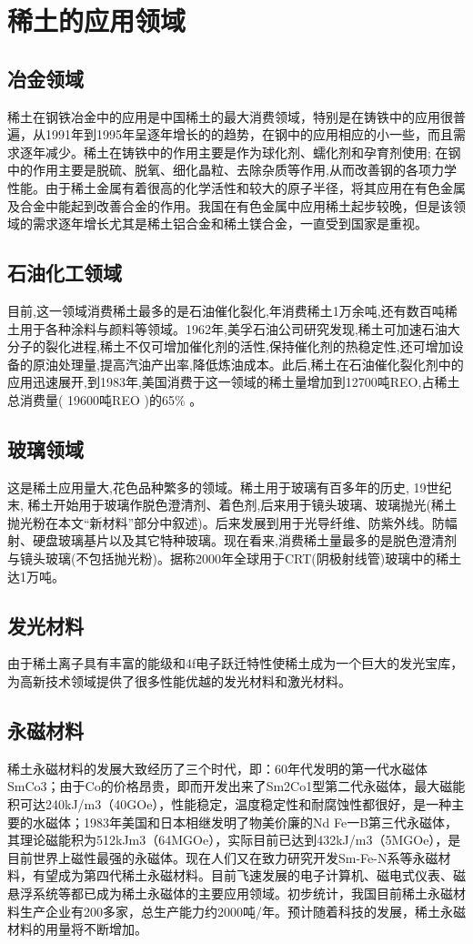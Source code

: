 \documentclass[twoside,twocolumn]{article}
\begin{document}

\section{稀土的应用领域}

\subsection{冶金领域}
稀土在钢铁冶金中的应用是中国稀土的最大消费领域，特别是在铸铁中的应用很普遍，从1991年到1995年呈逐年增长的的趋势，在钢中的应用相应的小一些，而且需求逐年减少。稀土在铸铁中的作用主要是作为球化剂、蠕化剂和孕育剂使用; 在钢中的作用主要是脱硫、脱氧、细化晶粒、去除杂质等作用,从而改善钢的各项力学性能。由于稀土金属有着很高的化学活性和较大的原子半径，将其应用在有色金属及合金中能起到改善合金的作用。我国在有色金属中应用稀土起步较晚，但是该领域的需求逐年增长尤其是稀土铝合金和稀土镁合金，一直受到国家是重视。
\subsection{石油化工领域}
目前,这一领域消费稀土最多的是石油催化裂化,年消费稀土1万余吨,还有数百吨稀土用于各种涂料与颜料等领域。1962年,美孚石油公司研究发现,稀土可加速石油大分子的裂化进程,稀土不仅可增加催化剂的活性,保持催化剂的热稳定性,还可增加设备的原油处理量,提高汽油产出率,降低炼油成本。此后,稀土在石油催化裂化剂中的应用迅速展开,到1983年,美国消费于这一领域的稀土量增加到12700吨REO,占稀土总消费量( 19600吨REO )的65$\%$ 。
\subsection{玻璃领域}
这是稀土应用量大,花色品种繁多的领域。稀土用于玻璃有百多年的历史, 19世纪末, 稀土开始用于玻璃作脱色澄清剂、着色剂,后来用于镜头玻璃、玻璃抛光(稀土抛光粉在本文“新材料”部分中叙述)。后来发展到用于光导纤维、防紫外线。防幅射、硬盘玻璃基片以及其它特种玻璃。现在看来,消费稀土量最多的是脱色澄清剂与镜头玻璃(不包括抛光粉)。据称2000年全球用于CRT(阴极射线管)玻璃中的稀土达1万吨。
\subsection{发光材料}
由于稀土离子具有丰富的能级和4f电子跃迁特性使稀土成为一个巨大的发光宝库，为高新技术领域提供了很多性能优越的发光材料和激光材料。
\subsection{永磁材料}
稀土永磁材料的发展大致经历了三个时代，即：60年代发明的第一代水磁体SmCo3；由于Co的价格昂贵，即而开发出来了Sm2Co1型第二代永磁体，最大磁能积可达240kJ/m3（40GOe），性能稳定，温度稳定性和耐腐蚀性都很好，是一种主要的水磁体；1983年美国和日本相继发明了物美价廉的Nd Fe一B第三代永磁体，其理论磁能积为512kJm3（64MGOe），实际目前已达到432kJ/m3（5MGOe），是目前世界上磁性最强的永磁体。现在人们又在致力研究开发Sm-Fe-N系等永磁材料，有望成为第四代稀土永磁材料。目前飞速发展的电子计算机、磁电式仪表、磁悬浮系统等都已成为稀土永磁体的主要应用领域。初步统计，我国目前稀土永磁材料生产企业有200多家，总生产能力约2000吨/年。预计随着科技的发展，稀土永磁材料的用量将不断增加。
\end{document}

